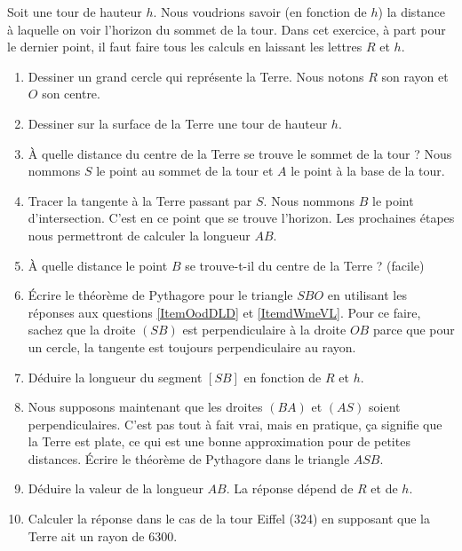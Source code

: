 
\begin{exercice}\label{exoSeconde-0080}


    Soit une tour de hauteur \( h\). Nous voudrions savoir (en fonction de \( h\)) la distance à laquelle on voir l'horizon du sommet de la tour. Dans cet exercice, à part pour le dernier point, il faut faire tous les calculs en laissant les lettres \( R\) et \( h\).
    \begin{enumerate}
        \item
            Dessiner un grand cercle qui représente la Terre. Nous notons \( R\) son rayon et \( O\) son centre.
        \item   \label{ItemOodDLD}
            Dessiner sur la surface de la Terre une tour de hauteur \( h\).
        \item
            À quelle distance du centre de la Terre se trouve le sommet de la tour ? Nous nommons \( S\) le point au sommet de la tour et \( A\) le point à la base de la tour.
        \item
            Tracer la tangente à la Terre passant par \( S\). Nous nommons \( B\) le point d'intersection. C'est en ce point que se trouve l'horizon. Les prochaines étapes nous permettront de calculer la longueur \( AB\).
        \item   \label{ItemdWmeVL}
            À quelle distance le point \( B\) se trouve-t-il du centre de la Terre ? (facile)
        \item
            Écrire le théorème de Pythagore pour le triangle \( SBO\) en utilisant les réponses aux questions \ref{ItemOodDLD} et \ref{ItemdWmeVL}. Pour ce faire, sachez que la droite \( (SB)\) est perpendiculaire à la droite \( OB\) parce que pour un cercle, la tangente est toujours perpendiculaire au rayon.
        \item
            Déduire la longueur du segment \( [SB]\) en fonction de \( R\) et \( h\).
        \item
            Nous supposons maintenant que les droites \( (BA)\) et \( (AS)\) soient perpendiculaires. C'est pas tout à fait vrai, mais en pratique, ça signifie que la Terre est plate, ce qui est une bonne approximation pour de petites distances. Écrire le théorème de Pythagore dans le triangle \( ASB\).
        \item
            Déduire la valeur de la longueur \( AB\). La réponse dépend de \( R\) et de \( h\).
        \item
            Calculer la réponse dans le cas de la tour Eiffel (\unit{324}{\meter}) en supposant que la Terre ait un rayon de \unit{6300}{\kilo\meter}.
    \end{enumerate}

\end{exercice}
